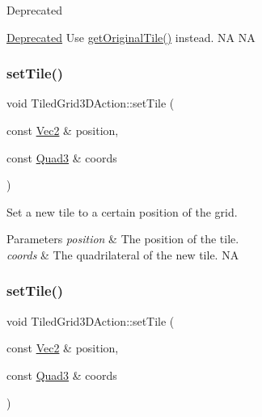 \begin{DoxyRefDesc}{Deprecated}
\item[\hyperlink{deprecated__deprecated000240}{Deprecated}]Use \hyperlink{classTiledGrid3DAction_a4529b2fa5b1aafecad8537985c2d7d1b}{get\+Original\+Tile()} instead.  NA  NA \end{DoxyRefDesc}
\mbox{\label{classTiledGrid3DAction_aa916f780d3f7837a9bd3d012ce1be936}} 
\subsubsection{\texorpdfstring{set\+Tile()}{setTile()}\hspace{0.1cm}{\footnotesize\ttfamily [1/2]}}
{\footnotesize\ttfamily void Tiled\+Grid3\+D\+Action\+::set\+Tile (\begin{DoxyParamCaption}\item[{const \hyperlink{classVec2}{Vec2} \&}]{position,  }\item[{const \hyperlink{structQuad3}{Quad3} \&}]{coords }\end{DoxyParamCaption})}



Set a new tile to a certain position of the grid. 


\begin{DoxyParams}{Parameters}
{\em position} & The position of the tile. \\
\hline
{\em coords} & The quadrilateral of the new tile.  NA \\
\hline
\end{DoxyParams}
\mbox{\label{classTiledGrid3DAction_aa916f780d3f7837a9bd3d012ce1be936}} 
\subsubsection{\texorpdfstring{set\+Tile()}{setTile()}\hspace{0.1cm}{\footnotesize\ttfamily [2/2]}}
{\footnotesize\ttfamily void Tiled\+Grid3\+D\+Action\+::set\+Tile (\begin{DoxyParamCaption}\item[{const \hyperlink{classVec2}{Vec2} \&}]{position,  }\item[{const \hyperlink{structQuad3}{Quad3} \&}]{coords }\end{DoxyParamCaption})}



